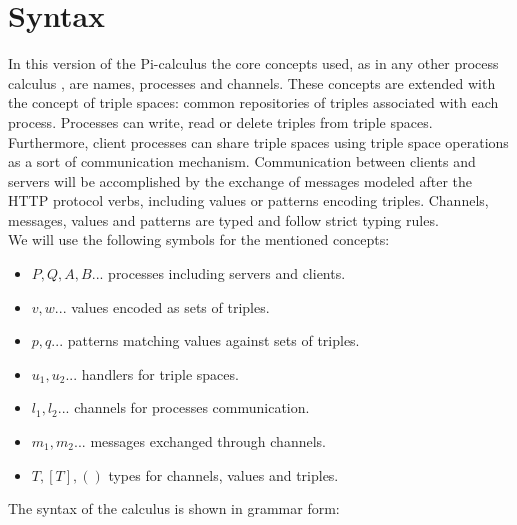\section{Syntax}
In this version of the Pi-calculus the core concepts used, as in any other process calculus \cite{Tutorial91thepolyadic} \cite{Milner89acalculus}, are names, processes and channels. These concepts are extended with the concept of triple spaces: common repositories of triples associated with each process. Processes can write, read or delete triples from triple spaces. Furthermore, client processes can share triple spaces using triple space operations as a sort of communication mechanism. Communication between clients and servers will be accomplished by the exchange of messages modeled after the HTTP protocol verbs, including values or patterns encoding triples. Channels, messages, values and patterns are typed and follow strict typing rules.\\
We will use the following symbols for the mentioned concepts:
\begin{itemize}
\item $P,Q,A,B...$ processes including servers and clients.
\item $v,w...$ values encoded as sets of triples.
\item $p,q...$ patterns matching values against sets of triples.
\item $u_1,u_2...$ handlers for triple spaces.
\item $l_1,l_2... $ channels for processes communication.
\item $m_1,m_2...$ messages exchanged through channels.
\item $T,[T],()$ types for channels, values and triples.
\end{itemize}

The syntax of the calculus is shown in grammar form:

